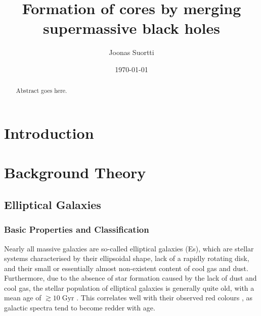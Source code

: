 \documentclass[english, oneside]{HYgradu}
\title{Formation of cores by merging supermassive black holes}
\author{Joonas Suortti}
\date{\today}
\begin{document}
\maketitle

\doublespacing

\begin{abstract}
Abstract goes here.
\end{abstract}

\mytableofcontents



\chapter{Introduction}

\chapter{Background Theory}

\section{Elliptical Galaxies} \label{section:elliptical}

\subsection{Basic Properties and Classification}

Nearly all massive galaxies are so-called elliptical galaxies (Es), which are stellar systems characterised by their ellipsoidal shape, lack of a rapidly rotating disk, and their small or essentially almost non-existent content of cool gas and dust. Furthermore, due to the absence of star formation caused by the lack of dust and cool gas, the stellar population of elliptical galaxies is generally quite old, with a mean age of $\gtrsim{10} \; \mathrm{Gyr}$ \citep{GalaxyFormationAndEvo2010}. This correlates well with their observed red colours \citep{Cappellari2016}, as galactic spectra tend to become redder with age.
\end{document}
